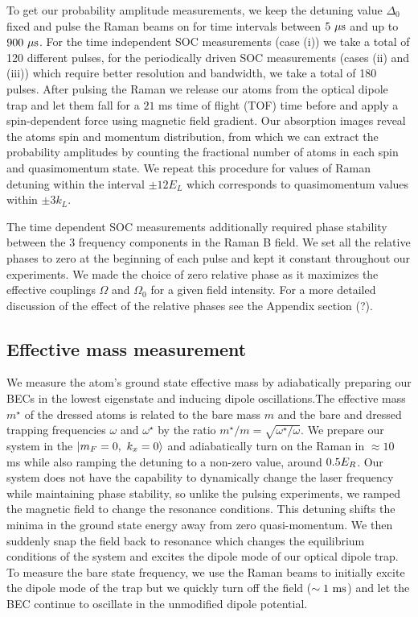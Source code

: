 To get our probability amplitude measurements, we keep the detuning value $\Delta_0$ fixed and pulse the Raman beams on for time intervals between $5{\ \mu{\rm s}}$ and up to $900{\ \mu{\rm s}}$. For the time independent SOC measurements (case (i)) we take a total of 120 different pulses, for the periodically driven SOC measurements (cases (ii) and (iii)) which require better resolution and bandwidth, we take a total of 180 pulses. After pulsing the Raman we release our atoms from the optical dipole trap and let them fall for a $21$ ms time of flight (TOF) time before and apply a spin-dependent force using magnetic field gradient. Our absorption images reveal the atoms spin and momentum distribution, from which we can extract the probability amplitudes by counting the fractional number of atoms in each spin and quasimomentum state. We repeat this procedure for values of Raman detuning within the interval $\pm 12 E_L$ which corresponds to quasimomentum values within $\pm 3k_L$.

The time dependent SOC measurements additionally required phase stability between the 3 frequency components in the Raman B field. We set all the relative phases to zero at the beginning of each pulse and kept it constant throughout our experiments. We made the choice of zero relative phase as it maximizes the effective couplings $\Omega$ and $\Omega_0$ for a given field intensity. For a more detailed discussion of the effect of the relative phases see the Appendix section (?). 

\subsection{Effective mass measurement}

We measure the atom's ground state effective mass by adiabatically preparing our BECs in the lowest eigenstate and inducing dipole oscillations.The effective mass $m^{\star}$ of the dressed atoms  is related to the bare mass $m$ and the bare and dressed trapping frequencies $\omega$ and $\omega^{\star}$ by the ratio $m^{\star}/m=\sqrt{\omega^{\star}/\omega}$. We prepare our system in the  $\ket{m_F=0,\ k_x=0}$ and adiabatically turn on the Raman in $\approx10$ ms while also ramping the detuning to a non-zero value, around $0.5{{E_R}}$. Our system does not have the capability to dynamically change the laser frequency while maintaining phase stability, so unlike the pulsing experiments, we ramped the magnetic field to change the resonance conditions. This detuning shifts the minima in the ground state energy away from zero quasi-momentum. We then suddenly snap the field back to resonance which changes the equilibrium conditions of the system and excites the dipole mode of our optical dipole trap. To measure the bare state frequency, we use the Raman beams to initially excite the dipole mode of the trap but we quickly turn off the field ($\sim1{\ {\rm ms}}$) and let the BEC continue to oscillate in the unmodified dipole potential. 

